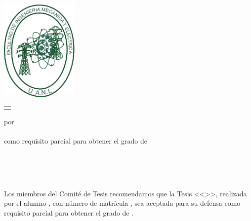 \begin{scshape}
\begin{center}
	{\Large \uanl} \\[5mm]
	{\large \fime} \\[5mm]
	{\large \depg}
	\vskip 16mm
	\includegraphics[height=50mm]{fime}
	\vskip 16mm
	\begin{tabular}{p{11cm}}
		\centering
		{\large \titulo}
	\end{tabular}
	\vskip 7mm
	{por}\\[7mm]
	{\large \autor}\\[7mm]
	{como requisito parcial para obtener el grado de}\\[3mm]
	\MakeUppercase{\grado}\\
	\orientacion
	\vfill
	\fecha
\end{center}
\end{scshape}

\newpage
\thispagestyle{empty}
\enlargethispage{5mm}

\begin{center}
{\bf \large \uanl} \\
{\bf \fime} \\
{\bf \depg}
\end{center}
\vskip 4mm

Los miembros del Comité de Tesis recomendamos que la Tesis <<\titulo>>, realizada por el alumno \autor, con número de matrícula \matricula, sea aceptada para su defensa como requisito parcial para obtener el grado de \grado\orientacion.
\ifdoctorado{\vskip 10mm}\else{\vskip 8mm}\fi

